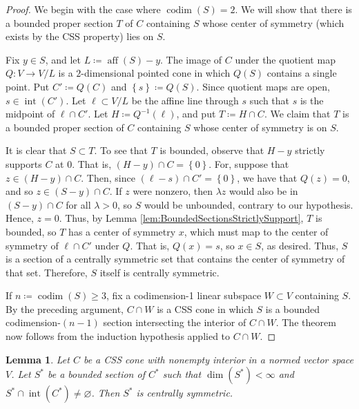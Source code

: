 \documentclass[10pt]{amsart}
\newtheorem{lemma}[thm]{Lemma}
\theoremstyle{definition}
\theoremstyle{remark}
\begin{document}
\begin{proof}
   We begin with the case where ${\operatorname{codim}}(S) = 2$.  We will show
   that there is a bounded proper section $T$ of $C$ containing
   $S$ whose center of symmetry (which exists by the CSS property)
   lies on $S$.
   
   Fix $y \in S$, and let $L {\mathrel{\coloneqq}} \operatorname{aff}(S) - y$.  The image of
   $C$ under the quotient map $Q {\colon} V \to V/L$ is a
   $2$-dimensional pointed cone in which $Q(S)$ contains a single
   point.  Put $C' {\mathrel{\coloneqq}} Q(C)$ and ${\left\lbrace {s} \right\rbrace} {\mathrel{\coloneqq}} Q(S)$.
   Since quotient maps are open, $s \in {\operatorname{int}}(C')$.  Let $\ell
   \subset V/L$ be the affine line through $s$ such that $s$ is
   the midpoint of $\ell \cap C'$.  Let $H {\mathrel{\coloneqq}} Q^{-1}(\ell)$,
   and put $T {\mathrel{\coloneqq}} H \cap C$.  We claim that $T$ is a bounded
   proper section of $C$ containing $S$ whose center of symmetry
   is on $S$.
   
   It is clear that $S \subset T$.  To see that $T$ is bounded,
   observe that $H - y$ strictly supports $C$ at $0$.  That is,
   $(H-y) \cap C = {\left\lbrace {0} \right\rbrace}$.  For, suppose that $z \in (H-y)
   \cap C$.  Then, since $(\ell - s) \cap C' = {\left\lbrace {0} \right\rbrace}$, we have
   that $Q(z) = 0$, and so $z \in (S-y) \cap C$.  If $z$ were
   nonzero, then $\lambda z$ would also be in $(S-y) \cap C$ for
   all $\lambda > 0$, so $S$ would be unbounded, contrary to our
   hypothesis.  Hence, $z = 0$.  Thus, by Lemma
   \ref{lem:BoundedSectionsStrictlySupport}, $T$ is bounded, so
   $T$ has a center of symmetry $x$, which must map to the center
   of symmetry of $\ell \cap C'$ under $Q$.  That is, $Q(x) = s$,
   so $x \in S$, as desired.  Thus, $S$ is a section of a
   centrally symmetric set that contains the center of symmetry of
   that set.  Therefore, $S$ itself is centrally symmetric.
   
   If $n {\mathrel{\coloneqq}} {\operatorname{codim}}(S) \ge 3$, fix a codimension-1 linear
   subspace $W \subset V$ containing $S$.  By the preceding
   argument, $C \cap W$ is a CSS cone in which $S$ is a bounded
   codimension-$(n-1)$ section intersecting the interior of $C
   \cap W$.  The theorem now follows from the induction hypothesis
   applied to $C \cap W$.
\end{proof}

\begin{lemma}
   \label{lem:CSSImpliesDualIsCoCSS}
   Let $C$ be a CSS cone with nonempty interior in a normed vector
   space $V$.  Let $S^{\ast}$ be a bounded section of ${C^{\ast}}$
   such that $\dim(S^{\ast}) < \infty$ and $S^{\ast} \cap
   {\operatorname{int}}({C^{\ast}}) \ne {\varnothing}$.  Then $S^{\ast}$ is centrally
   symmetric.
\end{lemma}
\end{document}
